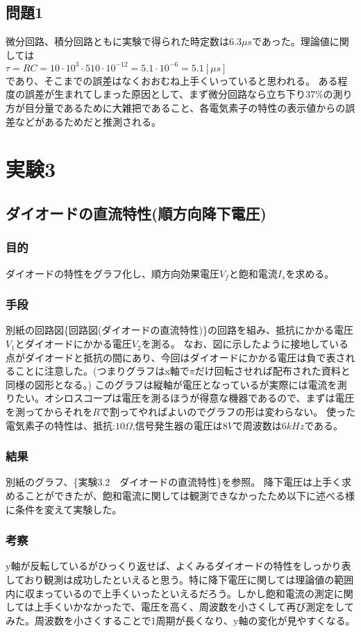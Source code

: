 \documentclass{jsarticle}
\begin{document}
\subsection{問題1}
微分回路、積分回路ともに実験で得られた時定数は$6.3\mu s$であった。理論値に関しては\\
$\tau = RC = 10\cdot 10^3 \cdot 510 \cdot 10^{-12} = 5.1 \cdot 10^{-6} = 5.1 [\mu s]$\\
であり、そこまでの誤差はなくおおむね上手くいっていると思われる。
ある程度の誤差が生まれてしまった原因として、まず微分回路なら立ち下り37\%の測り方が目分量であるために大雑把であること、各電気素子の特性の表示値からの誤差などがあるためだと推測される。

\section{実験3}
\subsection{ダイオードの直流特性(順方向降下電圧)}
\subsubsection{目的}
ダイオードの特性をグラフ化し、順方向効果電圧$V_{f}$と飽和電流$I_{s}$を求める。
\subsubsection{手段}
別紙の回路図\{回路図(ダイオードの直流特性)\}の回路を組み、抵抗にかかる電圧$V_{1}$とダイオードにかかる電圧$V_{2}$を測る。
なお、図に示したように接地している点がダイオードと抵抗の間にあり、今回はダイオードにかかる電圧は負で表されることに注意した。(つまりグラフはx軸で$\pi$だけ回転させれば配布された資料と同様の図形となる。)
このグラフは縦軸が電圧となっているが実際には電流を測りたい。オシロスコープは電圧を測るほうが得意な機器であるので、まずは電圧を測ってからそれを$R$で割ってやればよいのでグラフの形は変わらない。
使った電気素子の特性は、抵抗:$10\Omega$,信号発生器の電圧は$8V$で周波数は$6kHz$である。
\subsubsection{結果}
別紙のグラフ、\{実験3.2　ダイオードの直流特性\}を参照。
降下電圧は上手く求めることができたが、飽和電流に関しては観測できなかったため以下に述べる様に条件を変えて実験した。
\subsubsection{考察}
y軸が反転しているがひっくり返せば、よくみるダイオードの特性をしっかり表しており観測は成功したといえると思う。特に降下電圧に関しては理論値の範囲内に収まっているので上手くいったといえるだろう。しかし飽和電流の測定に関しては上手くいかなかったで、電圧を高く、周波数を小さくして再び測定をしてみた。周波数を小さくすることで1周期が長くなり、y軸の変化が見やすくなる。
\end{document}
